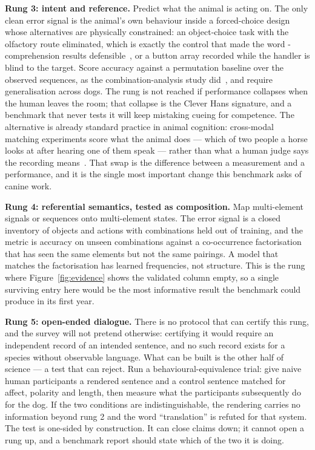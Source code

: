 \textbf{Rung 3: intent and reference.} Predict what the animal is acting on.
The only clean error signal is the animal's own behaviour inside a forced-choice
design whose alternatives are physically constrained: an object-choice task with
the olfactory route eliminated, which is exactly the control that made the word
- comprehension results defensible~\cite{kaminski2004rico,pilley2011chaser}, or a
button array recorded while the handler is blind to the target. Score accuracy
against a permutation baseline over the observed sequences, as the
combination-analysis study did~\cite{bastos2024scirep}, and require
generalisation across dogs. The rung is not reached if performance collapses
when the human leaves the room; that collapse is the Clever Hans signature, and
a benchmark that never tests it will keep mistaking cueing for competence.
The alternative is already standard practice in animal cognition: cross-modal
matching experiments score what the animal does --- which of two people a
horse looks at after hearing one of them speak --- rather than what a human
judge says the recording
means~\cite{proops2009horses,proops2012familiar}. That swap is the difference
between a measurement and a performance, and it is the single most important
change this benchmark asks of canine work.

\textbf{Rung 4: referential semantics, tested as composition.} Map multi-element signals or sequences onto
multi-element states. The error signal is a closed inventory of objects and
actions with combinations held out of training, and the metric is accuracy on
unseen combinations against a co-occurrence factorisation that has seen the same
elements but not the same pairings. A model that matches the factorisation has
learned frequencies, not structure. This is the rung where
Figure~\ref{fig:evidence} shows the validated column empty, so a single
surviving entry here would be the most informative result the benchmark could
produce in its first year.

\textbf{Rung 5: open-ended dialogue.} There is no protocol that can certify this
rung, and the survey will not pretend otherwise: certifying it would require an
independent record of an intended sentence, and no such record exists for a
species without observable language. What can be built is the other half of
science --- a test that can reject. Run a behavioural-equivalence trial: give
naive human participants a rendered sentence and a control sentence matched for
affect, polarity and length, then measure what the participants subsequently do
for the dog. If the two conditions are indistinguishable, the rendering carries
no information beyond rung 2 and the word ``translation'' is refuted for that
system. The test is one-sided by construction. It can close claims down; it
cannot open a rung up, and a benchmark report should state which of the two it
is doing.

